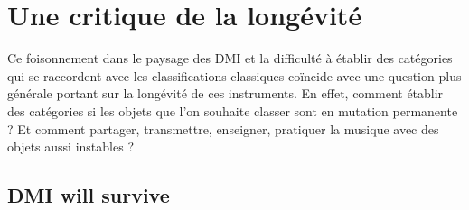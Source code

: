 \section{Une critique de la longévité}
\label{sec:ephemerality:critique}

\noindent Ce foisonnement dans le paysage des \gls{DMI} et la difficulté à établir des catégories qui se raccordent avec les classifications classiques coïncide avec une question plus générale portant sur la longévité de ces instruments. En effet, comment établir des catégories si les objets que l'on souhaite classer sont en mutation permanente ? Et comment partager, transmettre, enseigner, pratiquer la musique avec des objets aussi instables ?

\subsection{DMI will survive}

